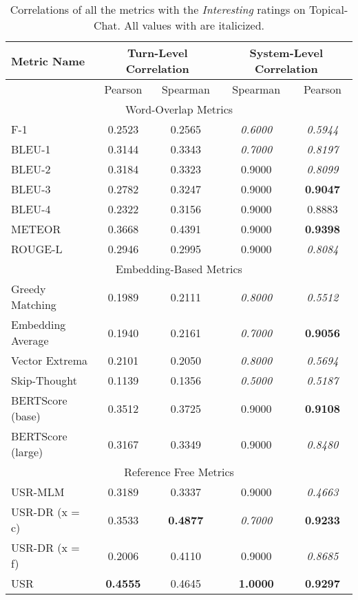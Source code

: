 \documentclass[11pt,a4paper]{article}
\begin{document}
\begin{table*}
    \centering
    \renewcommand*{\arraystretch}{1.2}
    \begin{tabular}{|l|c|c|c|c|}
    \hline
        \textbf{Metric Name} & \multicolumn{2}{|c|}{\textbf{Turn-Level Correlation}} & \multicolumn{2}{|c|}{\textbf{System-Level Correlation}}  \\ \hline
         & Pearson & Spearman & Spearman & Pearson \\ \hline
         \multicolumn{5}{|c|}{Word-Overlap Metrics} \\ \hline
F-1 & 0.2523 & 0.2565 & \textit{0.6000} & \textit{0.5944} \\
BLEU-1 & 0.3144 & 0.3343 & \textit{0.7000} & \textit{0.8197} \\
BLEU-2 & 0.3184 & 0.3323 & 0.9000 & \textit{0.8099} \\
BLEU-3 & 0.2782 & 0.3247 & 0.9000 & \textbf{0.9047} \\
BLEU-4 & 0.2322 & 0.3156 & 0.9000 & 0.8883 \\
METEOR & 0.3668 & 0.4391 & 0.9000 & \textbf{0.9398} \\
ROUGE-L & 0.2946 & 0.2995 & 0.9000 & \textit{0.8084} \\ \hline
\multicolumn{5}{|c|}{Embedding-Based Metrics} \\ \hline
Greedy Matching & 0.1989 & 0.2111 & \textit{0.8000} & \textit{0.5512} \\
Embedding Average & 0.1940 & 0.2161 & \textit{0.7000} & \textbf{0.9056} \\
Vector Extrema & 0.2101 & 0.2050 & \textit{0.8000} & \textit{0.5694} \\
Skip-Thought & 0.1139 & 0.1356 & \textit{0.5000} & \textit{0.5187} \\
BERTScore (base) & 0.3512 & 0.3725 & 0.9000 & \textbf{0.9108} \\
BERTScore (large) & 0.3167 & 0.3349 & 0.9000 & \textit{0.8480} \\ \hline
\multicolumn{5}{|c|}{Reference Free Metrics} \\ \hline
USR-MLM & 0.3189 & 0.3337 & 0.9000 & \textit{0.4663} \\
USR-DR (x = c) & 0.3533 & \textbf{0.4877} & \textit{0.7000} & \textbf{0.9233} \\
USR-DR (x = f) & 0.2006 & 0.4110 & 0.9000 & \textit{0.8685} \\
USR & \textbf{0.4555} & 0.4645 & \textbf{1.0000} & \textbf{0.9297} \\  \hline
    \end{tabular}
    \caption{Correlations of all the metrics with the \textit{Interesting} ratings on Topical-Chat. All values with  are italicized.}
    
\end{table*}
\end{document}
